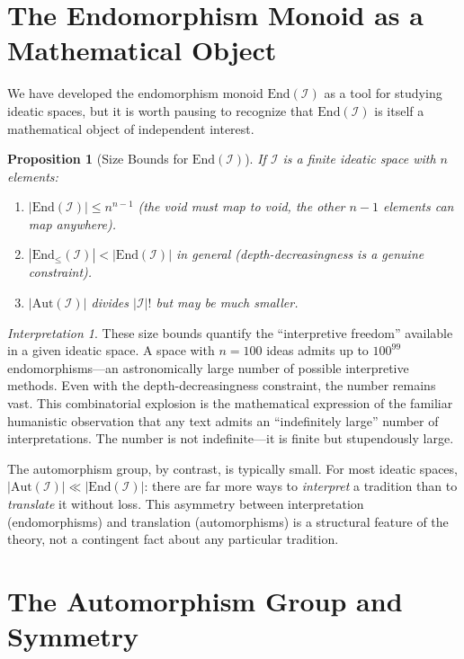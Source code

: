 \documentclass[11pt,openany]{book}
\theoremstyle{definition}
\theoremstyle{plain}
\newtheorem{proposition}[axiom]{Proposition}
\theoremstyle{remark}
\newtheorem{interpretation}[axiom]{Interpretation}
\newcommand{\IS}{\mathcal{I}}               %
\begin{document}
\section{The Endomorphism Monoid as a Mathematical Object}

We have developed the endomorphism monoid $\mathrm{End}(\IS)$ as a tool for studying ideatic spaces, but it is worth pausing to recognize that $\mathrm{End}(\IS)$ is itself a mathematical object of independent interest.

\begin{proposition}[Size Bounds for $\mathrm{End}(\IS)$]
If $\IS$ is a finite ideatic space with $n$ elements:
\begin{enumerate}
\item $|\mathrm{End}(\IS)| \leq n^{n-1}$ (the void must map to void, the other $n-1$ elements can map anywhere).
\item $|\mathrm{End}_{\leq}(\IS)| < |\mathrm{End}(\IS)|$ in general (depth-decreasingness is a genuine constraint).
\item $|\mathrm{Aut}(\IS)|$ divides $|\IS|!$ but may be much smaller.
\end{enumerate}
\end{proposition}

\begin{interpretation}
These size bounds quantify the ``interpretive freedom'' available in a given ideatic space. A space with $n = 100$ ideas admits up to $100^{99}$ endomorphisms---an astronomically large number of possible interpretive methods. Even with the depth-decreasingness constraint, the number remains vast. This combinatorial explosion is the mathematical expression of the familiar humanistic observation that any text admits an ``indefinitely large'' number of interpretations. The number is not indefinite---it is finite but stupendously large.

The automorphism group, by contrast, is typically small. For most ideatic spaces, $|\mathrm{Aut}(\IS)| \ll |\mathrm{End}(\IS)|$: there are far more ways to \emph{interpret} a tradition than to \emph{translate} it without loss. This asymmetry between interpretation (endomorphisms) and translation (automorphisms) is a structural feature of the theory, not a contingent fact about any particular tradition.
\end{interpretation}

\section{The Automorphism Group and Symmetry}
\end{document}
